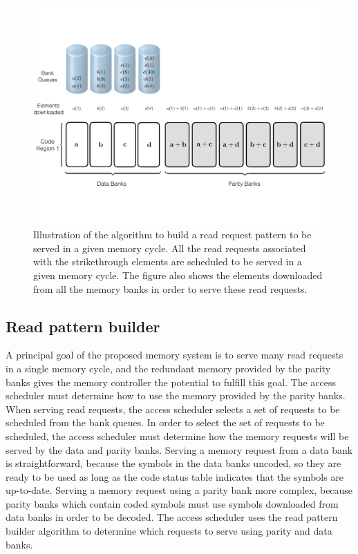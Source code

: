 \begin{figure}[htbp]
	\centering
	\includegraphics[width=0.96\linewidth]{fig/Read-Algo-Example.pdf}
	\caption{{Illustration of the algorithm to build a read request pattern to be served in a given memory cycle. All the read requests associated with the strikethrough elements are scheduled to be served in a given memory cycle. The figure also shows the elements downloaded from all the memory banks in order to serve these read requests.}}
	\label{fig:readAlgoAccessPattern}
\end{figure}
\subsection{Read pattern builder}
\label{sec:readCodingAlgo}

{\color{blue}
A principal goal of the proposed memory system is to serve many read requests in a single memory cycle, and the redundant memory provided by the parity banks gives the memory controller the potential to fulfill this goal. The access scheduler must determine how to use the memory provided by the parity banks. When serving read requests, the access scheduler selects a set of requests to be scheduled from the bank queues. In order to select the set of requests to be scheduled, the access scheduler must determine how the memory requests will be served by the data and parity banks. Serving a memory request from a data bank is straightforward, because the symbols in the data banks uncoded, so they are ready to be used as long as the code status table indicates that the symbols are up-to-date. Serving a memory request using a parity bank more complex, because parity banks which contain coded symbols must use symbols downloaded from data banks in order to be decoded. The access scheduler uses the read pattern builder algorithm to determine which requests to serve using parity and data banks. 
}

